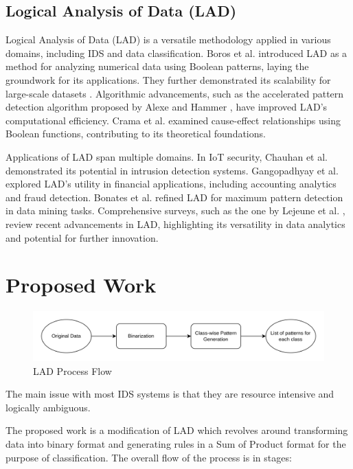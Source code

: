 \documentclass[pdflatex,sn-mathphys-num]{sn-jnl}%
\let\oldcaption\caption
\renewcommand{\caption}[1]{\oldcaption{\centering #1}}
\theoremstyle{thmstyleone}%
\theoremstyle{thmstyletwo}%
\theoremstyle{thmstylethree}%
\begin{document}
\subsection{Logical Analysis of Data (LAD)}  
Logical Analysis of Data (LAD) is a versatile methodology applied in various domains, including IDS and data classification. Boros et al. \cite{LAD1} introduced LAD as a method for analyzing numerical data using Boolean patterns, laying the groundwork for its applications. They further demonstrated its scalability for large-scale datasets \cite{LAD2}. Algorithmic advancements, such as the accelerated pattern detection algorithm proposed by Alexe and Hammer \cite{LAD5}, have improved LAD's computational efficiency. Crama et al. \cite{LAD6} examined cause-effect relationships using Boolean functions, contributing to its theoretical foundations.

Applications of LAD span multiple domains. In IoT security, Chauhan et al. \cite{LAD7} demonstrated its potential in intrusion detection systems. Gangopadhyay et al. \cite{LAD8} explored LAD's utility in financial applications, including accounting analytics and fraud detection. Bonates et al. \cite{LAD9} refined LAD for maximum pattern detection in data mining tasks. Comprehensive surveys, such as the one by Lejeune et al. \cite{LAD4}, review recent advancements in LAD, highlighting its versatility in data analytics and potential for further innovation.

\section{Proposed Work}\label{sec:Methodology}
\begin{figure}[ht!]
    \centering
    \includegraphics[width=\linewidth]{Methedology.drawio.png}
    \caption{LAD Process Flow}
    \label{fig:LAD}
\end{figure}

The main issue with most IDS systems is that they are resource intensive and logically ambiguous.

The proposed work is a modification of LAD which revolves around transforming data into binary format and generating rules in a Sum of Product format for the purpose of classification. The overall flow of the process is in stages: 
\end{document}
